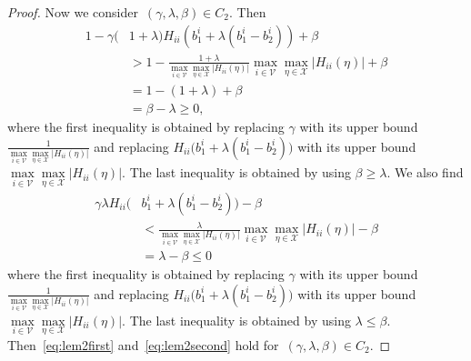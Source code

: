 \documentclass[9pt,shortpaper,twoside,web]{ieeecolor}
\newcommand{\X}{\ensuremath{\mathcal{X}}\xspace}
\newcommand{\V}{\ensuremath{\mathcal{V}}\xspace}
\begin{document}
\begin{proof}
    Now we consider~$(\gamma,\lambda,\beta)\in C_2$. Then 
    \begin{align}
        1-\gamma(&1+\lambda)H_{ii}(b^i_1 +\lambda(b^i_1-b^i_2)) + \beta 
    \\&> 1-\frac{1+\lambda}{\max\limits_{i\in\V}\max\limits_{\eta\in\X}\vert H_{ii}(\eta)\vert}\max\limits_{i\in\V}\max\limits_{\eta\in\X}\vert H_{ii}(\eta)\vert +\beta
    \\&= 1-(1+\lambda)+\beta
    \\&= \beta-\lambda\geq 0,
    \end{align}
    where the first inequality is obtained by replacing $\gamma$ with its upper bound $\frac{1}{ \max\limits_{i\in\V}\max\limits_{\eta\in\X}\vert H_{ii}(\eta)\vert}$ and replacing $H_{ii}\big(b^i_1+\lambda(b^i_1-b^i_2)\big)$ with its upper bound $\max\limits_{i\in\V}\max\limits_{\eta\in\X}\vert H_{ii}(\eta)\vert$. The last inequality is obtained by using $\beta \geq \lambda$. We also find 
    \begin{align}
        \gamma\lambda H_{ii}\big(&b^i_1+\lambda(b^i_1-b^i_2)\big)-\beta
    \\&< \frac{\lambda}{ \max\limits_{i\in\V}\max\limits_{\eta\in\X}\vert H_{ii}(\eta)\vert}\max\limits_{i\in\V}\max\limits_{\eta\in\X}\vert H_{ii}(\eta)\vert -\beta
    \\&= \lambda - \beta \leq 0 
    \end{align}
    where the first inequality is obtained by replacing $\gamma$ with its upper bound $\frac{1}{ \max\limits_{i\in\V}\max\limits_{\eta\in\X}\vert H_{ii}(\eta)\vert}$ and replacing $H_{ii}\big(b^i_1+\lambda(b^i_1-b^i_2)\big)$ with its upper bound $\max\limits_{i\in\V}\max\limits_{\eta\in\X}\vert H_{ii}(\eta)\vert$. The last inequality is obtained by using $\lambda\leq\beta$.
    Then~\eqref{eq:lem2first} and~\eqref{eq:lem2second} hold for~$(\gamma,\lambda,\beta)\in C_2$. 
    \end{proof}
    
\end{document}
